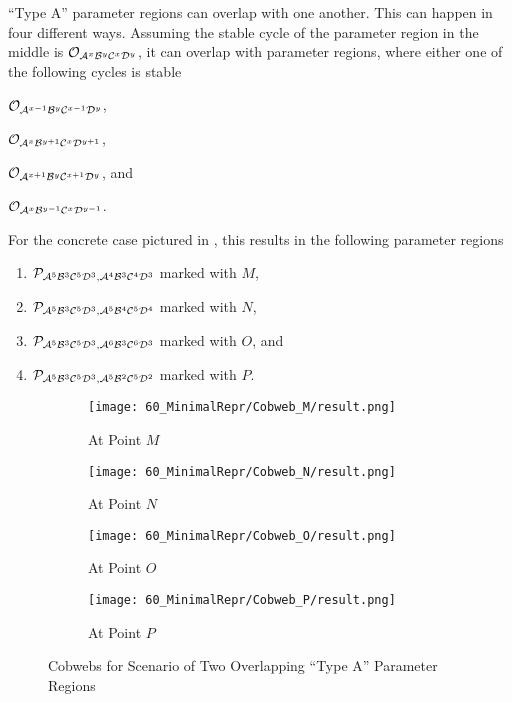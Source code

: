 ``Type A'' parameter regions can overlap with one another.
This can happen in four different ways.
Assuming the stable cycle of the parameter region in the middle is $\mathcal{O}_{\mathcal{A}^x\mathcal{B}^y\mathcal{C}^x\mathcal{D}^y}$, it can overlap with parameter regions, where either one of the following cycles is stable
\begin{enumerate*}
    \item $\mathcal{O}_{\mathcal{A}^{x-1}\mathcal{B}^y\mathcal{C}^{x-1}\mathcal{D}^y}$,
    \item $\mathcal{O}_{\mathcal{A}^x\mathcal{B}^{y+1}\mathcal{C}^x\mathcal{D}^{y+1}}$,
    \item $\mathcal{O}_{\mathcal{A}^{x+1}\mathcal{B}^y\mathcal{C}^{x+1}\mathcal{D}^y}$, and
    \item $\mathcal{O}_{\mathcal{A}^x\mathcal{B}^{y-1}\mathcal{C}^x\mathcal{D}^{y-1}}$.
\end{enumerate*}
For the concrete case pictured in , this results in the following parameter regions
\begin{enumerate}
    \item $\mathcal{P}_{\mathcal{A}^5\mathcal{B}^3\mathcal{C}^5\mathcal{D}^3, \mathcal{A}^4\mathcal{B}^3\mathcal{C}^4\mathcal{D}^3}$ marked with $M$,
    \item $\mathcal{P}_{\mathcal{A}^5\mathcal{B}^3\mathcal{C}^5\mathcal{D}^3, \mathcal{A}^5\mathcal{B}^4\mathcal{C}^5\mathcal{D}^4}$ marked with $N$,
    \item $\mathcal{P}_{\mathcal{A}^5\mathcal{B}^3\mathcal{C}^5\mathcal{D}^3, \mathcal{A}^6\mathcal{B}^3\mathcal{C}^6\mathcal{D}^3}$ marked with $O$, and
    \item $\mathcal{P}_{\mathcal{A}^5\mathcal{B}^3\mathcal{C}^5\mathcal{D}^3, \mathcal{A}^5\mathcal{B}^2\mathcal{C}^5\mathcal{D}^2}$ marked with $P$.
\end{enumerate}

\begin{figure}
    \centering
    \begin{subfigure}{0.4\textwidth}
        \texttt{[image: 60\_MinimalRepr/Cobweb\_M/result.png]}
        \caption{At Point $M$}
        \label{fig:minrep.cobweb.M}
    \end{subfigure}
    \begin{subfigure}{0.4\textwidth}
        \texttt{[image: 60\_MinimalRepr/Cobweb\_N/result.png]}
        \caption{At Point $N$}
        \label{fig:minrep.cobweb.N}
    \end{subfigure}
    \begin{subfigure}{0.4\textwidth}
        \texttt{[image: 60\_MinimalRepr/Cobweb\_O/result.png]}
        \caption{At Point $O$}
        \label{fig:minrep.cobweb.O}
    \end{subfigure}
    \begin{subfigure}{0.4\textwidth}
        \texttt{[image: 60\_MinimalRepr/Cobweb\_P/result.png]}
        \caption{At Point $P$}
        \label{fig:minrep.cobweb.P}
    \end{subfigure}
    \caption{Cobwebs for Scenario of Two Overlapping ``Type A'' Parameter Regions}
\end{figure}

